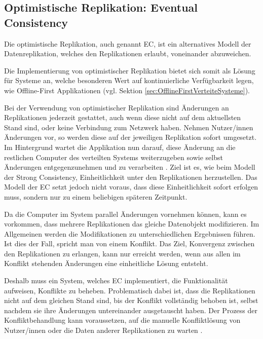 \documentclass[a4paper, 12pt]{scrreprt}
\begin{document}
\subsection{Optimistische Replikation: Eventual Consistency}

Die optimistische Replikation, auch genannt \acf{EC}, ist ein alternatives Modell der Datenreplikation, welches den Replikationen erlaubt, voneinander abzuweichen.

Die Implementierung von optimistischer Replikation bietet sich somit als Lösung für Systeme an, welche besonderen Wert auf kontinuierliche Verfügbarkeit legen, wie Offline-First Applikationen (vgl. Sektion \ref{sec:OfflineFirstVerteiteSysteme}). 

Bei der Verwendung von optimistischer Replikation sind Änderungen an Replikationen jederzeit gestattet, auch wenn diese nicht auf dem aktuellsten Stand sind, oder keine Verbindung zum Netzwerk haben. Nehmen Nutzer/innen Änderungen vor, so werden diese auf der jeweiligen Replikation sofort umgesetzt. Im Hintergrund wartet die Applikation nun darauf, diese Änderung an die restlichen Computer des verteilten Systems weiterzugeben sowie selbst Änderungen entgegenzunehmen und zu verarbeiten \autocite[S. 46]{ArticleOptimisticReplication}. Ziel ist es, wie beim Modell der Strong Consistency, Einheitlichkeit unter den Replikationen herzustellen. Das Modell der \ac{EC} setzt jedoch nicht voraus, dass diese Einheitlichkeit sofort erfolgen muss, sondern nur zu einem beliebigen späteren Zeitpunkt. 

Da die Computer im System parallel Änderungen vornehmen können, kann es vorkommen, dass mehrere Replikationen das gleiche Datenobjekt modifizieren. Im Allgemeinen werden die Modifikationen zu unterschiedlichen Ergebnissen führen. Ist dies der Fall, spricht man von einem Konflikt. Das Ziel, Konvergenz zwischen den Replikationen zu erlangen, kann nur erreicht werden, wenn aus allen im Konflikt stehenden Änderungen eine einheitliche Lösung entsteht.

Deshalb muss ein System, welches \ac{EC} implementiert, die Funktionalität aufweisen, Konflikte zu beheben. Problematisch dabei ist, dass die Replikationen nicht auf dem gleichen Stand sind, bis der Konflikt vollständig behoben ist, selbst nachdem sie ihre Änderungen untereinander ausgetauscht haben. Der Prozess der Konfliktbehandlung kann voraussetzen, auf die manuelle Konfliktlösung von Nutzer/innen oder die Daten anderer Replikationen zu warten \autocite[S.~174-175]{ArticleEventualConsistencyConflicts}.
\end{document}
